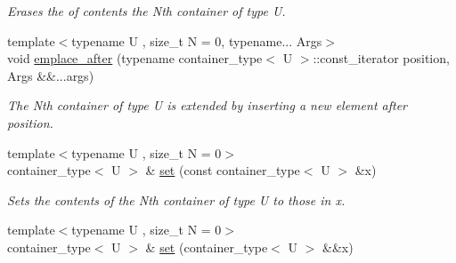 \begin{DoxyCompactItemize}
\begin{DoxyCompactList}\small\item\em Erases the of contents the Nth container of type U. \end{DoxyCompactList}\item 
\hypertarget{classheterogeneous_1_1heteroforward__list_3_01_t_00_01_types_8_8_8_4_a510c0a05b0cc0dcaf2f748c9ce4152f4}{}{\footnotesize template$<$typename U , size\+\_\+t N = 0, typename... Args$>$ }\\void \hyperlink{classheterogeneous_1_1heteroforward__list_3_01_t_00_01_types_8_8_8_4_a510c0a05b0cc0dcaf2f748c9ce4152f4}{emplace\+\_\+after} (typename container\+\_\+type$<$ U $>$\+::const\+\_\+iterator position, Args \&\&...args)\label{classheterogeneous_1_1heteroforward__list_3_01_t_00_01_types_8_8_8_4_a510c0a05b0cc0dcaf2f748c9ce4152f4}

\begin{DoxyCompactList}\small\item\em The Nth container of type U is extended by inserting a new element after position. \end{DoxyCompactList}\item 
\hypertarget{classheterogeneous_1_1heteroforward__list_3_01_t_00_01_types_8_8_8_4_afb0553bf7cff5a472b4715bc0a291e2d}{}{\footnotesize template$<$typename U , size\+\_\+t N = 0$>$ }\\container\+\_\+type$<$ U $>$ \& \hyperlink{classheterogeneous_1_1heteroforward__list_3_01_t_00_01_types_8_8_8_4_afb0553bf7cff5a472b4715bc0a291e2d}{set} (const container\+\_\+type$<$ U $>$ \&x)\label{classheterogeneous_1_1heteroforward__list_3_01_t_00_01_types_8_8_8_4_afb0553bf7cff5a472b4715bc0a291e2d}

\begin{DoxyCompactList}\small\item\em Sets the contents of the Nth container of type U to those in x. \end{DoxyCompactList}\item 
\hypertarget{classheterogeneous_1_1heteroforward__list_3_01_t_00_01_types_8_8_8_4_a17b52ab9110393ffa1cb82ce8ffe1e57}{}{\footnotesize template$<$typename U , size\+\_\+t N = 0$>$ }\\container\+\_\+type$<$ U $>$ \& \hyperlink{classheterogeneous_1_1heteroforward__list_3_01_t_00_01_types_8_8_8_4_a17b52ab9110393ffa1cb82ce8ffe1e57}{set} (container\+\_\+type$<$ U $>$ \&\&x)\label{classheterogeneous_1_1heteroforward__list_3_01_t_00_01_types_8_8_8_4_a17b52ab9110393ffa1cb82ce8ffe1e57}


\end{DoxyCompactItemize}
